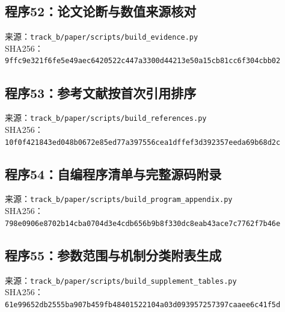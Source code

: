 \subsection*{程序52：论文论断与数值来源核对}
\noindent 来源：\nolinkurl{track_b/paper/scripts/build_evidence.py}\\
\noindent SHA256：\texttt{9ffc9e321f6fe5e49aec6420522c447a}\allowbreak\texttt{3300d44213e50a15cb81cc6f304cbb02}\\
\clearpage
\subsection*{程序53：参考文献按首次引用排序}
\noindent 来源：\nolinkurl{track_b/paper/scripts/build_references.py}\\
\noindent SHA256：\texttt{10f0f421843ed048b0672e85ed77a397}\allowbreak\texttt{556cea1dffef3d392357eeda69b68d2c}\\
\clearpage
\subsection*{程序54：自编程序清单与完整源码附录}
\noindent 来源：\nolinkurl{track_b/paper/scripts/build_program_appendix.py}\\
\noindent SHA256：\texttt{798e0906e8702b14cba0704d3e4cdb65}\allowbreak\texttt{6b9b8f330dc8eab43ace7c7762f7b46e}\\
\clearpage
\subsection*{程序55：参数范围与机制分类附表生成}
\noindent 来源：\nolinkurl{track_b/paper/scripts/build_supplement_tables.py}\\
\noindent SHA256：\texttt{61e99652db2555ba907b459fb4840152}\allowbreak\texttt{2104a03d093957257397caaee6c41f5d}\\
\clearpage
